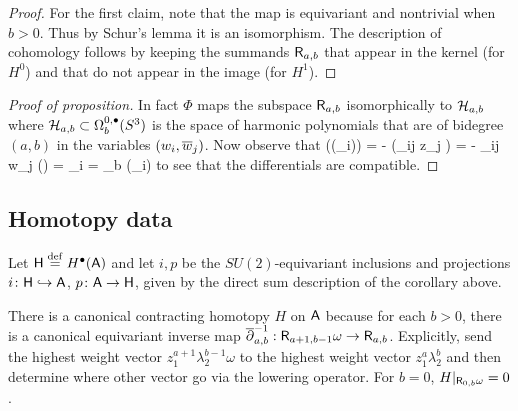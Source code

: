 \documentclass[11pt]{amsart}
\renewcommand{\op}{\operatorname}
\begin{document}
\begin{proof}
For the first claim, note that the map is equivariant and nontrivial when $b > 0$. Thus by Schur's lemma it is an isomorphism.
The description of cohomology follows by keeping the summands $\sfR_{a,b}$ that appear in the kernel (for $H^0$) and that do not appear in the image (for $H^1$).
\end{proof}

%

\begin{proof}[Proof of proposition]
In fact $\Phi$ maps the subspace $\sfR_{a,b}$ isomorphically to $\cH_{a,b}$ where $\cH_{a,b} \subset \Omega^{0,\bu}_b (S^3)$ is the space of harmonic polynomials that are of bidegree $(a,b)$ in the variables $(w_i,\Bar{w}_j)$.
Now observe that
\beqn
\Phi(\dbar(\lambda_i)) = - \Phi(\ep_{ij} z_j \omega) = - \ep_{ij} w_j \Phi (\omega) = \xi_i = \dbar_b \Phi (\lambda_i) 
\eeqn
to see that the differentials are compatible.
\end{proof}

\subsection{Homotopy data}

Let $\sfH \define H^\bu(\sfA)$ and let $i,p$ be the $SU(2)$-equivariant inclusions and projections $i \colon \sfH \hookrightarrow \sfA$, $p \colon \sfA \to \sfH$, given by the direct sum description of the corollary above.

There is a canonical contracting homotopy $H$ on $\sfA$ 
because for each $b > 0$, there is a canonical equivariant inverse map $\dbar_{a,b}^{-1}:  \sfR_{a+1,b-1} \omega \to \sfR_{a,b}$.
Explicitly, send the highest weight vector $z_1^{a+1} \lambda_2^{b-1} \omega$ to the highest weight vector $z_1^{a} \lambda_2^{b}$ and then determine where other vector go via the lowering operator.
For $b = 0$, $H|_{\sfR_{0,b}\omega} = 0$.
\end{document}
